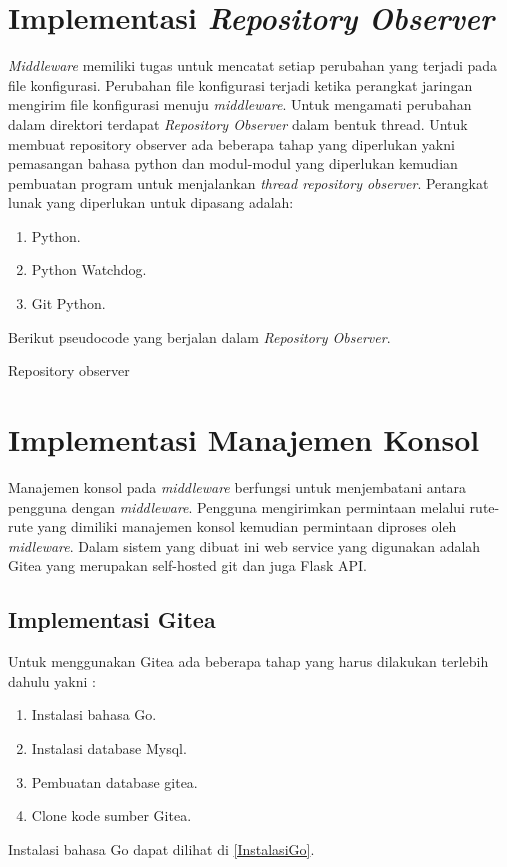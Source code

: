    
   	\section{Implementasi \textit{Repository Observer}}
   		\textit{Middleware} memiliki tugas untuk mencatat setiap perubahan yang terjadi pada file konfigurasi. Perubahan file konfigurasi terjadi ketika perangkat jaringan mengirim file konfigurasi menuju \textit{middleware}. Untuk mengamati perubahan dalam direktori terdapat \textit{Repository Observer} dalam bentuk thread. Untuk membuat repository observer ada beberapa tahap yang diperlukan yakni pemasangan bahasa python dan modul-modul yang diperlukan kemudian pembuatan program untuk menjalankan \textit{thread repository observer}. Perangkat lunak yang diperlukan untuk dipasang adalah:
   			\begin{enumerate}
   				\item Python.
   				\item Python Watchdog.
   				\item Git Python.
   			\end{enumerate}	
   		  Berikut pseudocode yang berjalan dalam \textit{Repository Observer}.
   		\begin{algorithm}[H]
   			\caption{Repository observer}
   		\end{algorithm}
   	\section{Implementasi Manajemen Konsol}
   		Manajemen konsol pada \textit{middleware} berfungsi untuk menjembatani antara pengguna dengan \textit{middleware}. Pengguna mengirimkan permintaan melalui rute-rute yang dimiliki manajemen konsol kemudian permintaan diproses oleh \textit{midleware}. Dalam sistem yang dibuat ini web service yang digunakan adalah Gitea yang merupakan self-hosted git dan juga Flask API. 
   		\subsection{Implementasi Gitea}
   		
   		Untuk menggunakan Gitea ada beberapa tahap yang harus dilakukan terlebih dahulu yakni :
   			\begin{enumerate}
   				\item Instalasi bahasa Go.
   				\item Instalasi database Mysql.
   				\item Pembuatan database gitea.
   				\item Clone kode sumber Gitea.
   			\end{enumerate}
   		Instalasi bahasa Go dapat dilihat di \ref{InstalasiGo}.\\
   		
